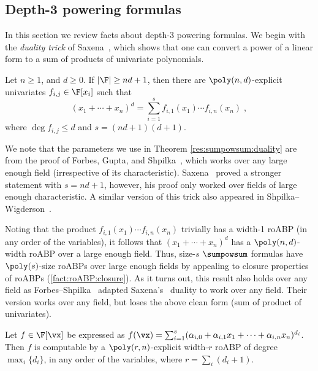 \documentclass[11pt]{article}
\numberwithin{equation}{section}
\theoremstyle{definition}
\theoremstyle{plain}
\begin{document}
\subsection{Depth-3 powering formulas}

In this section we review facts about depth-3 powering formulas.  We begin with the \emph{duality trick} of Saxena~\cite{Saxena08}, which shows that one can convert a power of a linear form to a sum of products of univariate polynomials.

\begin{theoremwp}\label{res:sumpowsum:duality}
        Let $n\ge 1$, and $d\ge 0$. If $|\F|\ge nd+1$, then there are $\poly(n,d)$-explicit univariates $f_{i,j}\in\F[x_i]$ such that
        \[
                (x_1+\cdots+x_n)^d=\sum_{i=1}^s f_{i,1}(x_1)\cdots f_{i,n}(x_n)
                \;,
        \]
        where $\deg f_{i,j}\le d$ and $s=(nd+1)(d+1)$.
\end{theoremwp}

We note that the parameters we use in Theorem \ref{res:sumpowsum:duality}  are from the proof of Forbes, Gupta, and Shpilka~\cite{ForbesGS13}, which works over any large enough field (irrespective of its characteristic). Saxena~\cite{Saxena08} proved a stronger statement with  $s=nd+1$, however, his proof  only worked over fields of large enough characteristic. A similar version of this trick also appeared in Shpilka--Wigderson~\cite{ShpilkaWigderson01}.

Noting that the product $f_{i,1}(x_1)\cdots f_{i,n}(x_n)$ trivially has a width-1 roABP (in any order of the variables), it follows that $(x_1+\cdots+x_n)^d$ has a $\poly(n,d)$-width roABP over a large enough field.  Thus, size-$s$ $\sumpowsum$ formulas have $\poly(s)$-size roABPs over large enough fields by appealing to closure properties of roABPs (\autoref{fact:roABP:closure}).  As it turns out, this result also holds over any field as Forbes--Shpilka~\cite{ForbesShpilka13b} adapted Saxena's~\cite{Saxena08} duality to work over any field.  Their version works over any field, but loses the above clean form (sum of product of univariates).

\begin{theoremwp}\label{res:sumpowsum:roABP}
        Let $f\in\F[\vx]$ be expressed as $f(\vx)=\sum_{i=1}^s (\alpha_{i,0}+\alpha_{i,1}x_1+\cdots+\alpha_{i,n}x_n)^{d_i}$.  Then $f$ is computable by a $\poly(r,n)$-explicit width-$r$ roABP of degree $\max_i\{d_i\}$, in any order of the variables, where $r=\sum_i (d_i+1)$.
\end{theoremwp}
\end{document}

